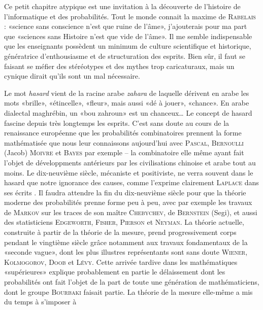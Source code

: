 {{%

\nocite{encycl-sci-ara}

Ce petit chapitre atypique est une invitation à la découverte de l'histoire de
l'informatique et des probabilités.  Tout le monde connait la maxime de
\textsc{Rabelais} : «science sans conscience n'est que ruine de l'âme»,
j'ajouterais pour ma part que «sciences sans Histoire n'est que vide de
l'âme». Il me semble indispensable que les enseignants possèdent un minimum de
culture scientifique et historique, génératrice d'enthousiasme et de
structuration des esprits. Bien sûr, il faut se faisant se méfier des
stéréotypes et des mythes trop caricaturaux, mais un cynique dirait qu'ils
sont un mal nécessaire.

Le mot \emph{hasard} vient de la racine arabe \emph{zahara} de laquelle
dérivent en arabe les mots «brille», «étincelle», «fleur», mais aussi «dé à
jouer», «chance».  En arabe dialectal maghrébin, un «bou zahroun» est un
chanceux\ldots{} Le concept de hasard fascine depuis très longtemps les
esprits. C'est sans doute au cours de la renaissance européenne que les
probabilités combinatoires prennent la forme mathématisée que nous leur
connaissons aujourd'hui avec \textsc{Pascal}, \textsc{Bernoulli} (Jacob)
\textsc{Moivre} et \textsc{Bayes} par exemple -- la combinatoire elle même
ayant fait l'objet de développments antérieurs par les civilisations chinoise
et arabe tout au moins.  Le dix-neuvième siècle, mécaniste et positiviste, ne
verra souvent dans le hasard que notre ignorance des causes, comme l'exprime
clairement \textsc{Laplace} dans ses écrits \cite{laplace-1,laplace-2}. Il
faudra attendre la fin du dix-neuvième siècle pour que la théorie moderne des
probabilités prenne forme peu à peu, avec par exemple les travaux de
\textsc{Markov} sur les traces de son maître \textsc{Chebychev}, de
\textsc{Bernstein} (Segi), et aussi des statisticiens \textsc{Edgeworth},
\textsc{Fisher}, \textsc{Pierson} et \textsc{Neyman}. La théorie actuelle,
construite à partir de la théorie de la mesure, prend progressivement corps
pendant le vingtième siècle grâce notamment aux travaux fondamentaux de la
«seconde vague», dont les plus illustres représentants sont sans doute
\textsc{Wiener}, \textsc{Kolmogorov}, \textsc{Doob} et \textsc{Lévy}. Cette
arrivée tardive dans les mathématiques «supérieures» explique probablement en
partie le délaissement dont les probabilités ont fait l'objet de la part de
toute une génération de mathématiciens, dont le groupe \textsc{Bourbaki}
faisait partie. La théorie de la mesure elle-même a mis du temps à s'imposer à
}}
